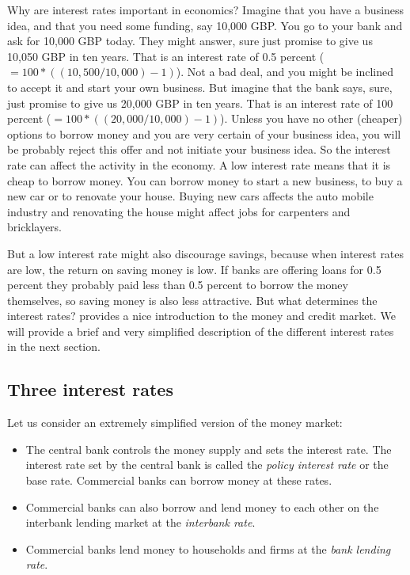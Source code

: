 \documentclass[]{book}
\providecommand{\tightlist}{%
  \setlength{\itemsep}{0pt}\setlength{\parskip}{0pt}}
\begin{document}
Why are interest rates important in economics? Imagine that you have a business idea, and that you need some funding, say 10,000 GBP. You go to your bank and ask for 10,000 GBP today. They might answer, sure just promise to give us 10,050 GBP in ten years. That is an interest rate of 0.5 percent (\(=100*((10,500/10,000)-1)\)). Not a bad deal, and you might be inclined to accept it and start your own business. But imagine that the bank says, sure, just promise to give us 20,000 GBP in ten years. That is an interest rate of 100 percent (\(=100*((20,000/10,000)-1)\)). Unless you have no other (cheaper) options to borrow money and you are very certain of your business idea, you will be probably reject this offer and not initiate your business idea. So the interest rate can affect the activity in the economy. A low interest rate means that it is cheap to borrow money. You can borrow money to start a new business, to buy a new car or to renovate your house. Buying new cars affects the auto mobile industry and renovating the house might affect jobs for carpenters and bricklayers.

But a low interest rate might also discourage savings, because when interest rates are low, the return on saving money is low. If banks are offering loans for 0.5 percent they probably paid less than 0.5 percent to borrow the money themselves, so saving money is also less attractive. But what determines the interest rates? \citep[chapter 10 in][]{core} provides a nice introduction to the money and credit market. We will provide a brief and very simplified description of the different interest rates in the next section.

\hypertarget{three-interest-rates}{%
\subsection{Three interest rates}\label{three-interest-rates}}

Let us consider an extremely simplified version of the money market:

\begin{itemize}
\tightlist
\item
  The central bank controls the money supply and sets the interest rate. The interest rate set by the central bank is called the \emph{policy interest rate} or the base rate. Commercial banks can borrow money at these rates.
\item
  Commercial banks can also borrow and lend money to each other on the interbank lending market at the \emph{interbank rate}.
\item
  Commercial banks lend money to households and firms at the \emph{bank lending rate}.
\end{itemize}
\end{document}
